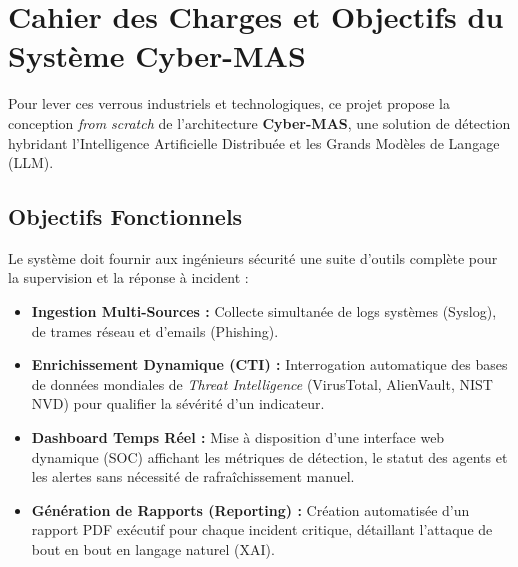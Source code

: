 \documentclass[a4paper, 12pt]{report}
\begin{document}
\section{Cahier des Charges et Objectifs du Système Cyber-MAS}
\label{sec:cahier_charges}

Pour lever ces verrous industriels et technologiques, ce projet propose la conception \textit{from scratch} de l'architecture \textbf{Cyber-MAS}, une solution de détection hybridant l'Intelligence Artificielle Distribuée et les Grands Modèles de Langage (LLM).

\subsection{Objectifs Fonctionnels}
Le système doit fournir aux ingénieurs sécurité une suite d'outils complète pour la supervision et la réponse à incident :
\begin{itemize}
    \item \textbf{Ingestion Multi-Sources :} Collecte simultanée de logs systèmes (Syslog), de trames réseau et d'emails (Phishing).
    \item \textbf{Enrichissement Dynamique (CTI) :} Interrogation automatique des bases de données mondiales de \textit{Threat Intelligence} (VirusTotal, AlienVault, NIST NVD) pour qualifier la sévérité d'un indicateur.
    \item \textbf{Dashboard Temps Réel :} Mise à disposition d'une interface web dynamique (SOC) affichant les métriques de détection, le statut des agents et les alertes sans nécessité de rafraîchissement manuel.
    \item \textbf{Génération de Rapports (Reporting) :} Création automatisée d'un rapport PDF exécutif pour chaque incident critique, détaillant l'attaque de bout en bout en langage naturel (XAI).
\end{itemize}
\end{document}
